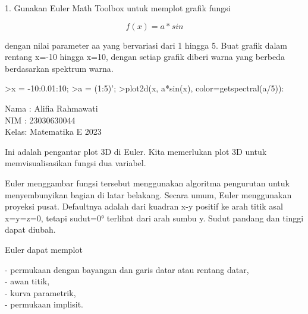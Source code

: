 \documentclass[a4paper,10pt]{article}
\begin{document}
\begin{eulernotebook}
\begin{eulercomment}
\begin{eulercomment}
\begin{eulercomment}
\begin{eulercomment}
\begin{eulercomment}
\begin{eulercomment}
\begin{eulercomment}
\begin{eulercomment}
\begin{eulercomment}
\begin{eulercomment}
\begin{eulercomment}
\begin{eulercomment}
\begin{eulercomment}
\begin{eulercomment}
\begin{eulercomment}
1. Gunakan Euler Math Toolbox untuk memplot grafik fungsi\\
\end{eulercomment}
\begin{eulerformula}
\[
f(x)=a*sin
\]
\end{eulerformula}
\begin{eulercomment}
dengan nilai parameter aa yang bervariasi dari 1 hingga 5. Buat grafik
dalam rentang x=-10 hingga x=10, dengan setiap grafik diberi warna
yang berbeda berdasarkan spektrum warna.
\end{eulercomment}
\begin{eulerprompt}
>x = -10:0.01:10;
>a = (1:5)';
>plot2d(x, a*sin(x), color=getspectral(a/5)):
\end{eulerprompt}
\begin{euleroutput}
  
\end{euleroutput}
\begin{eulercomment}
Nama : Alifia Rahmawati\\
NIM  : 23030630044\\
Kelas: Matematika E 2023


\begin{eulercomment}
\begin{eulercomment}
Ini adalah pengantar plot 3D di Euler. Kita memerlukan plot 3D untuk
memvisualisasikan fungsi dua variabel.

Euler menggambar fungsi tersebut menggunakan algoritma pengurutan
untuk menyembunyikan bagian di latar belakang. Secara umum, Euler
menggunakan proyeksi pusat. Defaultnya adalah dari kuadran x-y positif
ke arah titik asal x=y=z=0, tetapi sudut=0° terlihat dari arah sumbu
y. Sudut pandang dan tinggi dapat diubah.

Euler dapat memplot

- permukaan dengan bayangan dan garis datar atau rentang datar,\\
- awan titik,\\
- kurva parametrik,\\
- permukaan implisit.


\end{eulercomment}
\end{eulercomment}
\end{eulercomment}
\end{eulercomment}
\end{eulercomment}
\end{eulercomment}
\end{eulercomment}
\end{eulercomment}
\end{eulercomment}
\end{eulercomment}
\end{eulercomment}
\end{eulercomment}
\end{eulercomment}
\end{eulercomment}
\end{eulercomment}
\end{eulercomment}
\end{eulercomment}
\end{eulernotebook}
\end{document}
